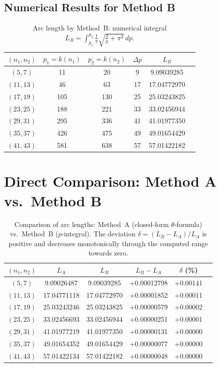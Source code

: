 \subsection{Numerical Results for Method B}

\begin{table}[H]
\centering
\caption{Arc length by Method~B: numerical integral
  $L_B = \int_{p_1}^{p_2} \frac{1}{\pi}\sqrt{\frac{3}{p}+\pi^2}\,dp$.}
\renewcommand{\arraystretch}{1.2}
\begin{tabular}{cccccc}
\toprule
$(n_1, n_2)$ & $p_1 = k(n_1)$ & $p_2 = k(n_2)$ & $\Delta p$ & $L_B$ \\
\midrule
$( 5,  7)$ &  11 &  20 &  9 &  9.09039285 \\
$(11, 13)$ &  46 &  63 & 17 & 17.04772970 \\
$(17, 19)$ & 105 & 130 & 25 & 25.03243825 \\
$(23, 25)$ & 188 & 221 & 33 & 33.02456944 \\
$(29, 31)$ & 295 & 336 & 41 & 41.01977350 \\
$(35, 37)$ & 426 & 475 & 49 & 49.01654429 \\
$(41, 43)$ & 581 & 638 & 57 & 57.01422182 \\
\bottomrule
\end{tabular}
\end{table}


\section{Direct Comparison: Method A vs.\ Method B}
\label{sec:methoden_vergleich}

\begin{table}[H]
\centering
\caption{Comparison of arc lengths: Method~A (closed-form $\theta$-formula)
  vs.\ Method~B ($p$-integral). The deviation $\delta = (L_B - L_A)/L_A$
  is positive and decreases monotonically through the computed range towards zero.}
\renewcommand{\arraystretch}{1.25}
\begin{tabular}{cccccc}
\toprule
$(n_1, n_2)$ & $L_A$ & $L_B$ & $L_B - L_A$ & $\delta$ (\%) \\
\midrule
$( 5,  7)$ &  9.09026487 &  9.09039285 & +0.00012798 & +0.00141 \\
$(11, 13)$ & 17.04771118 & 17.04772970 & +0.00001852 & +0.00011 \\
$(17, 19)$ & 25.03243246 & 25.03243825 & +0.00000579 & +0.00002 \\
$(23, 25)$ & 33.02456693 & 33.02456944 & +0.00000251 & +0.00001 \\
$(29, 31)$ & 41.01977219 & 41.01977350 & +0.00000131 & +0.00000 \\
$(35, 37)$ & 49.01654352 & 49.01654429 & +0.00000077 & +0.00000 \\
$(41, 43)$ & 57.01422134 & 57.01422182 & +0.00000048 & +0.00000 \\
\bottomrule
\end{tabular}
\end{table}

